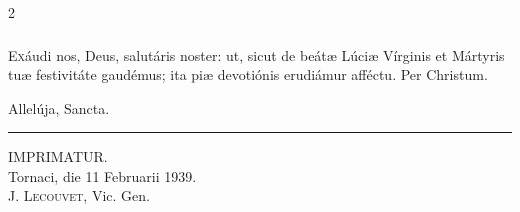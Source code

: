 \documentclass[9pt,twoside]{extarticle}
\begin{document}
\begin{multicols}{2}
\subsubsection*{\center {}}
\lettrine{E}xáudi nos, Deus, salutáris noster: ut, sicut de beátæ Lúciæ Vírginis et Mártyris tuæ festivitáte gaudémus; ita piæ devotiónis erudiámur afféctu. Per Christum.

\begin{tightlist}{}
\item {\small {}}
\item {\small {} Allelúja, Sancta.}
\end{tightlist}

\end{multicols}

\begin{center}\textcolor{red}{\rule{\linewidth}{0.5pt}} \end{center}

\vfill
\begin{center} IMPRIMATUR.\\
Tornaci, die 11 Februarii 1939.\\
\textsc{J. Lecouvet}, Vic. Gen.\end{center}
\vfill

\fancyhead[C]{}
\fancyfoot[C]{}
\cleardoublepage
{}
\renewcommand{\thepage}{\arabic{page}*}
\end{document}
